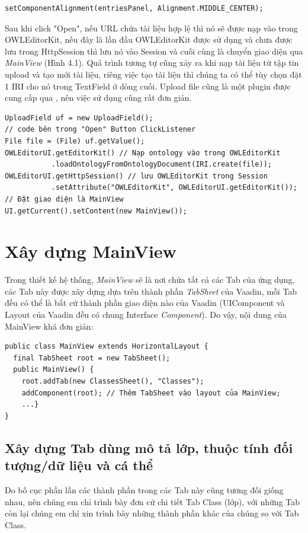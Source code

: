 \begin{verbatim}
setComponentAlignment(entriesPanel, Alignment.MIDDLE_CENTER);
\end{verbatim}
Sau khi click "Open", nếu URL chứa tài liệu hợp lệ thì nó sẽ được nạp vào trong OWLEditorKit, nếu đây là lần đầu OWLEditorKit được sử dụng và chưa được lưu trong HttpSession thì lưu nó vào Session và cuối cùng là chuyển giao diện qua \textit{MainView} (Hình 4.1). Quá trình tương tự cũng xảy ra khi nạp tài liệu từ tập tin upload và tạo mới tài liệu, riêng việc tạo tài liệu thì chúng ta có thể tùy chọn đặt 1 IRI cho nó trong TextField ở dòng cuối. Upload file cũng là một plugin được cung cấp qua \cite{vaadindirectory}, nên việc sử dụng cũng rất đơn giản.
\begin{verbatim}
UploadField uf = new UploadField();
// code bên trong "Open" Button ClickListener
File file = (File) uf.getValue();
OWLEditorUI.getEditorKit() // Nạp ontology vào trong OWLEditorKit
           .loadOntologyFromOntologyDocument(IRI.create(file));
OWLEditorUI.getHttpSession() // lưu OWLEditorKit trong Session
           .setAttribute("OWLEditorKit", OWLEditorUI.getEditorKit());
// Đặt giao diện là MainView 
UI.getCurrent().setContent(new MainView());                    
\end{verbatim}

\section{Xây dựng MainView}
Trong thiết kế hệ thống, \textit{MainView} sẽ là nơi chứa tất cả các Tab của ứng dụng, các Tab này được xây dựng dựa trên thành phần \textit{TabSheet} của Vaadin, mỗi Tab đều có thể là bất cứ thành phần giao diện nào của Vaadin (UIComponent và Layout của Vaadin đều có chung Interface \textit{Component}). Do vậy, nội dung của MainView khá đơn giản:
\begin{verbatim}
public class MainView extends HorizontalLayout {
  final TabSheet root = new TabSheet();
  public MainView() {
    root.addTab(new ClassesSheet(), "Classes");
    addComponent(root); // Thêm TabSheet vào layout của MainView;
    ...}
} 
\end{verbatim}
\subsection{Xây dựng Tab dùng mô tả lớp, thuộc tính đối tượng/dữ liệu và cá thể}
Do bố cục phần lần các thành phần trong các Tab này cũng tương đối giống nhau, nên chúng em chỉ trình bày đơn cử chi tiết Tab Class (lớp), với những Tab còn lại chúng em chỉ xin trình bày những thành phần khác của chúng so với Tab Class.

